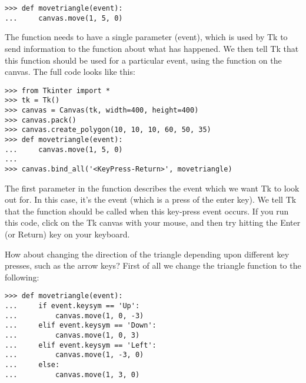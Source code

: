 \begin{listing}
\begin{verbatim}
>>> def movetriangle(event):
...     canvas.move(1, 5, 0)
\end{verbatim}
\end{listing}

The function needs to have a single parameter (event), which is used by Tk to send information to the function about what has happened.  We then tell Tk that this function should be used for a particular event, using the  function on the canvas. The full code looks like this:

\begin{listing}
\begin{verbatim}
>>> from Tkinter import *
>>> tk = Tk()
>>> canvas = Canvas(tk, width=400, height=400)
>>> canvas.pack()
>>> canvas.create_polygon(10, 10, 10, 60, 50, 35)
>>> def movetriangle(event):
...     canvas.move(1, 5, 0)
...
>>> canvas.bind_all('<KeyPress-Return>', movetriangle)
\end{verbatim}
\end{listing}

The first parameter in the  function describes the event which we want Tk to look out for. In this case, it's the event  (which is a press of the enter key).  We tell Tk that the  function should be called when this key-press event occurs.  If you run this code, click on the Tk canvas with your mouse, and then try hitting the Enter (or Return) key on your keyboard.

How about changing the direction of the triangle depending upon different key presses, such as the arrow keys? First of all we change the  triangle function to the following:

\begin{listing}
\begin{verbatim}
>>> def movetriangle(event):
...     if event.keysym == 'Up':
...         canvas.move(1, 0, -3)
...     elif event.keysym == 'Down':
...         canvas.move(1, 0, 3)
...     elif event.keysym == 'Left':
...         canvas.move(1, -3, 0)
...     else:
...         canvas.move(1, 3, 0)
\end{verbatim}
\end{listing}


